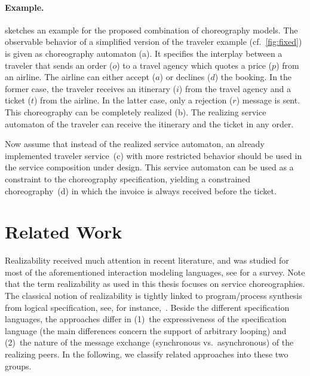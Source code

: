 \paragraph{Example.}

 sketches an example for the proposed combination of choreography models. The observable behavior of a simplified version of the traveler example (cf.\ \autoref{fig:fixed}) is given as choreography automaton (a). It specifies the interplay between a traveler that sends an order ($o$) to a travel agency which quotes a price ($p$) from an airline. The airline can either accept ($a$) or declines ($d$) the booking. In the former case, the traveler receives an itinerary ($i$) from the travel agency and a ticket ($t$) from the airline. In the latter case, only a rejection ($r$) message is sent. This choreography can be completely realized (b). The realizing service automaton of the traveler can receive the itinerary and the ticket in any order. 

Now assume that instead of the realized service automaton, an already implemented traveler service~(c) with more restricted behavior should be used in the service composition under design. This service automaton can be used as a constraint to the choreography specification, yielding a constrained choreography~(d) in which the invoice is always received before the ticket.





\section{Related Work}\label{sect:realizability_related}

Realizability received much attention in recent literature, and was studied for most of the aforementioned interaction modeling languages, see \cite{SuBFZ_2007_wsfm} for a survey. Note that the term realizability as used in this thesis focuses on service choreographies. The classical notion of realizability is tightly linked to program/process synthesis from logical specification, see, for instance,~\cite{Vardi_2008_25mc}. Beside the different specification languages, the approaches differ in (1)~the expressiveness of the specification language (the main differences concern the support of arbitrary looping) and (2)~the nature of the message exchange (synchronous vs.\ asynchronous) of the realizing peers. In the following, we classify related approaches into these two groups.


